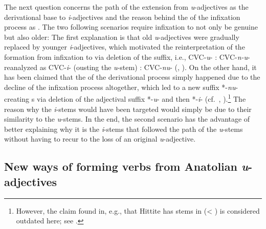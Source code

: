 \documentclass[output=paper,colorlinks,citecolor=brown]{langscibook}
\begin{document}
The next question concerns the path of the extension from \textit{u}-adjectives as the derivational base to \textit{i}-adjectives and the reason behind the  of the infixation process as . The two following scenarios require  infixation to not only be genuine but also older: The first explanation is that old \textit{u}-adjectives were gradually replaced  by younger \textit{i}-adjectives, which motivated the reinterpretation of the  formation from infixation to  via deletion of the suffix, i.e., CVC-\textit{u}- : CVC-\textit{n-u}- reanalyzed as CVC-\textit{i}- (ousting the \textit{u}-stem) : CVC-\textit{nu}- (\citealt[35]{Koch1973}, \citealt[27]{Tucker1981}). On the other hand, it has been claimed that the  of the derivational process simply happened due to the decline of the infixation process altogether, which led to a new suffix *-\textit{nu}- creating s via deletion of the adjectival suffix *-\textit{u}- and then *-\textit{i}- (cf.\ \citealt[245--247]{Oettinger1979}, \citeyear[157]{Oettinger2022}).\footnote{However, the claim found in, e.g., \citealt[246--247]{Oettinger1979} that Hittite has stems in  (< ) is considered outdated here; see \citealt[829]{Kloekhorst2008}.} The reason why the \textit{i}-stems would have been targeted would simply be due to their similarity to the \textit{u}-stems. In the end, the second scenario has the advantage of better explaining why it is the \textit{i}-stems that followed the path of the \textit{u}-stems without having to recur to the loss of an original \textit{u}-adjective.

\subsection{New ways of forming verbs from Anatolian \textit{u}-adjectives}
\label{sec:uadj}
\end{document}
